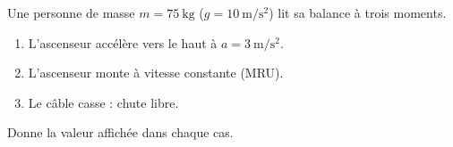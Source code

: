 \documentclass[11pt,a4paper]{article}
\begin{document}
\begin{exo}
Une personne de masse $m=\qty{75}{\kilogram}$ ($g=\qty{10}{\metre\per\second\squared}$)
lit sa balance à trois moments.
\begin{enumerate}[label=\alph*)]
  \item L'ascenseur accélère vers le haut à $a=\qty{3}{\metre\per\second\squared}$.
  \item L'ascenseur monte à vitesse constante (MRU).
  \item Le câble casse : chute libre.
\end{enumerate}
Donne la valeur affichée dans chaque cas.
\end{exo}
\end{document}
